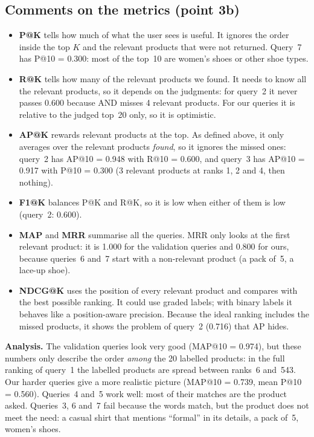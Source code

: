 \documentclass[11pt,a4paper]{article}
\begin{document}
\subsection{Comments on the metrics (point 3b)}
\begin{itemize}
  \item \textbf{P@K} tells how much of what the user sees is useful. It ignores the order inside the top $K$ and the
        relevant products that were not returned. Query~7 has P@10 = 0.300: most of the top~10 are women's shoes or
        other shoe types.
  \item \textbf{R@K} tells how many of the relevant products we found. It needs to know all the relevant products, so
        it depends on the judgments: for query~2 it never passes 0.600 because AND misses 4 relevant products. For our
        queries it is relative to the judged top~20 only, so it is optimistic.
  \item \textbf{AP@K} rewards relevant products at the top. As defined above, it only averages over the relevant
        products \emph{found}, so it ignores the missed ones: query~2 has AP@10 = 0.948 with R@10 = 0.600,
        and query~3 has AP@10 = 0.917 with P@10 = 0.300 (3 relevant products at ranks 1, 2 and 4, then nothing).
  \item \textbf{F1@K} balances P@K and R@K, so it is low when either of them is low (query~2: 0.600).
  \item \textbf{MAP} and \textbf{MRR} summarise all the queries. MRR only looks at the first relevant product: it is
        1.000 for the validation queries and 0.800 for ours, because queries~6 and~7 start with a non-relevant product
        (a pack of~5, a lace-up shoe).
  \item \textbf{NDCG@K} uses the position of every relevant product and compares with the best possible ranking. It
        could use graded labels; with binary labels it behaves like a position-aware precision. Because the ideal
        ranking includes the missed products, it shows the problem of query~2 (0.716) that AP hides.
\end{itemize}

\textbf{Analysis.} The validation queries look very good (MAP@10 = 0.974), but these numbers only describe the order
\emph{among} the 20 labelled products: in the full ranking of query~1 the labelled products are spread between ranks~6
and~543. Our harder queries give a more realistic picture (MAP@10 = 0.739, mean P@10 = 0.560). Queries~4 and~5 work
well: most of their matches are the product asked. Queries~3, 6 and~7 fail because the words match, but the product
does not meet the need: a casual shirt that mentions ``formal'' in its details, a pack of~5, women's shoes.
\end{document}

